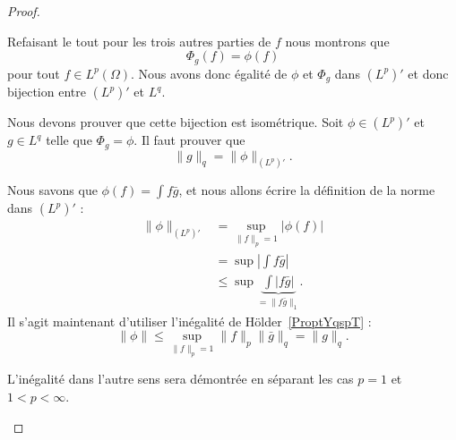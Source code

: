 \begin{proof}
\begin{subproof}
    Refaisant le tout pour les trois autres parties de \( f\) nous montrons que
    \begin{equation}
        \Phi_g(f)=\phi(f)
    \end{equation}
    pour tout \( f\in L^p(\Omega)\). Nous avons donc égalité de \( \phi\) et \( \Phi_g\) dans \(  (L^p)' \) et donc bijection entre \( (L^p)'\) et \( L^q\).


    Nous devons prouver que cette bijection est isométrique. Soit \( \phi\in (L^p)'\) et \( g\in L^q\) telle que \( \Phi_g=\phi\). Il faut prouver que
    \begin{equation}
        \| g \|_q=\| \phi \|_{(L^p)'}.
    \end{equation}


    Nous savons que \( \phi(f)=\int f\bar g\), et nous allons écrire la définition de la norme dans \( (L^p)'\) :
    \begin{subequations}
        \begin{align}
            \| \phi \|_{(L^p)'} & =\sup_{\| f \|_p=1}\big| \phi(f) \big|                   \\
                                & =\sup| \int f\bar g |                                    \\
                                & \leq\sup\underbrace{\int| f\bar g |}_{=\| f\bar g \|_1}.
        \end{align}
    \end{subequations}
    Il s'agit maintenant d'utiliser l'inégalité de Hölder~\ref{ProptYqspT} :
    \begin{equation}
        \| \phi \|\leq \sup_{\| f \|_p=1}\| f \|_p\| \bar g \|_q=\| g \|_q.
    \end{equation}

    L'inégalité dans l'autre sens sera démontrée en séparant les cas \( p=1\) et \( 1<p<\infty\).


\end{subproof}
\end{proof}
